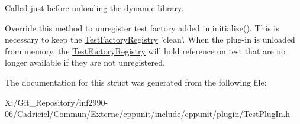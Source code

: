 Called just before unloading the dynamic library. 

Override this method to unregister test factory added in \hyperlink{struct_cpp_unit_test_plug_in_aec670330e7fced26c2a66b1dcd56edc0}{initialize()}. This is necessary to keep the \hyperlink{class_test_factory_registry}{Test\-Factory\-Registry} 'clean'. When the plug-\/in is unloaded from memory, the \hyperlink{class_test_factory_registry}{Test\-Factory\-Registry} will hold reference on test that are no longer available if they are not unregistered. 

The documentation for this struct was generated from the following file\-:\begin{DoxyCompactItemize}
\item 
X\-:/\-Git\-\_\-\-Repository/inf2990-\/06/\-Cadriciel/\-Commun/\-Externe/cppunit/include/cppunit/plugin/\hyperlink{_test_plug_in_8h}{Test\-Plug\-In.\-h}\end{DoxyCompactItemize}
